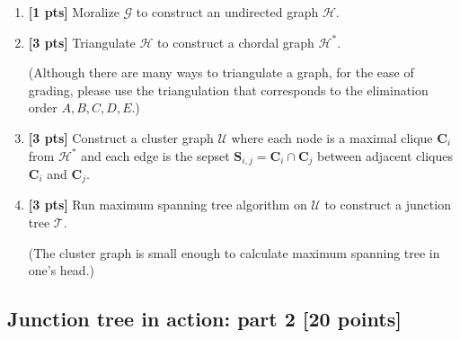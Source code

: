 \documentclass[12pt]{article}
\newcommand{\Gcal}{\mathcal{G}}
\newcommand{\Hcal}{\mathcal{H}}
\newcommand{\Ucal}{\mathcal{U}}
\newcommand{\Tcal}{\mathcal{T}}
\newcommand{\Cbs}{\boldsymbol{C}}
\newcommand{\Sbs}{\boldsymbol{S}}
\begin{document}
\begin{enumerate}
	\item \textbf{[1 pts]} Moralize $ \Gcal $ to construct an undirected graph $ \Hcal $.



	\item \textbf{[3 pts]} Triangulate $ \Hcal $ to construct a chordal graph $ \Hcal^* $.

	      (Although there are many ways to triangulate a graph, for the ease of grading, please use the triangulation that corresponds to the elimination order $ A, B, C, D, E $.)


	\item \textbf{[3 pts]} Construct a cluster graph $ \Ucal $ where each node is a maximal clique $ \Cbs_i $ from $ \Hcal^* $ and each edge is the sepset $ \Sbs_{i,j} = \Cbs_i \cap \Cbs_j $ between adjacent cliques $ \Cbs_i $ and $ \Cbs_j $.




	\item \textbf{[3 pts]} Run maximum spanning tree algorithm on $ \Ucal $ to construct a junction tree $ \Tcal $.

	      (The cluster graph is small enough to calculate maximum spanning tree in one's head.)


\end{enumerate}



\subsection{Junction tree in action: part 2 [20 points]}
\end{document}
